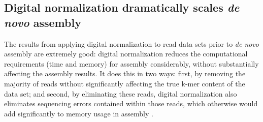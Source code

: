 \documentclass{pnastwo}
\begin{document}
\begin{article}
%
%

\subsection{Digital normalization dramatically scales {\em de novo} assembly}

The results from applying digital normalization to read data sets
prior to {\em de novo} assembly are extremely good: digital
normalization reduces the computational requirements (time and memory)
for assembly considerably, without substantially affecting the
assembly results.  It does this in two ways: first, by removing
the majority of reads without significantly affecting the true k-mer
content of the data set; and second, by eliminating these reads,
digital normalization also eliminates sequencing errors contained
within those reads, which otherwise would add significantly to memory
usage in assembly \cite{pubmed21245053}.


\end{article}
\end{document}
